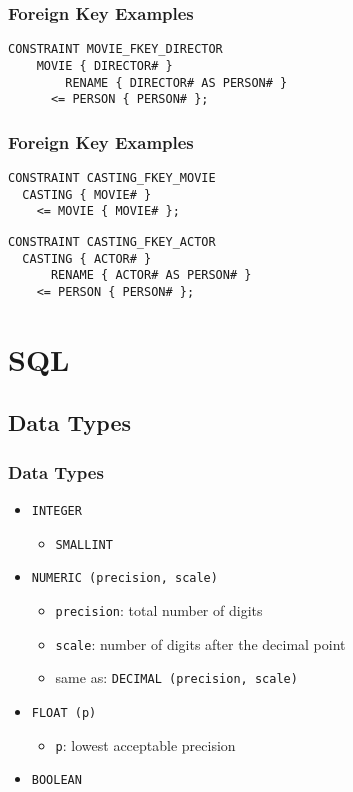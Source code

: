 \documentclass[dvipsnames]{beamer}
\theoremstyle{plain}
\begin{document}
\begin{frame}[fragile]
  \frametitle{Foreign Key Examples}

  \begin{lstlisting}
CONSTRAINT MOVIE_FKEY_DIRECTOR
    MOVIE { DIRECTOR# }
        RENAME { DIRECTOR# AS PERSON# }
      <= PERSON { PERSON# };
  \end{lstlisting}
\end{frame}

\begin{frame}[fragile]
  \frametitle{Foreign Key Examples}

  \begin{lstlisting}
CONSTRAINT CASTING_FKEY_MOVIE
  CASTING { MOVIE# }
    <= MOVIE { MOVIE# };
  \end{lstlisting}

  \begin{lstlisting}
CONSTRAINT CASTING_FKEY_ACTOR
  CASTING { ACTOR# }
      RENAME { ACTOR# AS PERSON# }
    <= PERSON { PERSON# };
  \end{lstlisting}
\end{frame}

\lstset{language=FullSQL}

\section{SQL}

\subsection{Data Types}

\begin{frame}
  \frametitle{Data Types}

  \begin{itemize}
    \item \texttt{INTEGER}
    \begin{itemize}
      \item \texttt{SMALLINT}
    \end{itemize}

    \medskip
    \item \texttt{NUMERIC (precision, scale)}
    \begin{itemize}
      \item \texttt{precision}: total number of digits
      \item \texttt{scale}: number of digits after the decimal point
      \item same as: \texttt{DECIMAL (precision, scale)}
    \end{itemize}

    \medskip
    \item \texttt{FLOAT (p)}
    \begin{itemize}
      \item \texttt{p}: lowest acceptable precision
    \end{itemize}

    \medskip
    \item \texttt{BOOLEAN}
  \end{itemize}
\end{frame}
\end{document}
